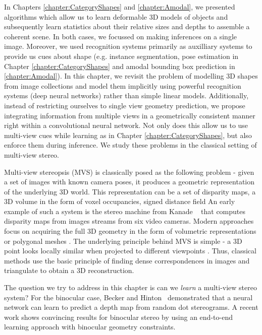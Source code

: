 \documentclass[../thesis.tex]{subfiles}
\begin{document}

In Chapters \ref{chapter:CategoryShapes} and \ref{chapter:Amodal}, we presented algorithms which allow us to learn deformable 3D models of objects and subsequently learn statistics about their relative sizes and depths to assemble a coherent scene. In both cases, we focussed on making inferences on a single image. Moreover, we used recognition systems primarily as auxilliary systems to provide us cues about shape (e.g. instance segmentation, pose estimation in Chapter \ref{chapter:CategoryShapes} and amodal bounding box prediction in \ref{chapter:Amodal}). In this chapter, we revisit the problem of modelling 3D shapes from image collections and model them implicitly using powerful recognition systems (deep neural networks) rather than simple linear models. Additionally, instead of restricting ourselves to single view geometry prediction, we propose integrating information from multiple views in a geometrically consistent manner right within a convolutional neural network. Not only does this allow us to use multi-view cues while learning as in Chapter \ref{chapter:CategoryShapes}, but also enforce them during inference. We study these problems in the classical setting of multi-view stereo.

Multi-view stereopsis (MVS) is classically posed as the following problem - given a set of images with known camera poses, it produces a geometric representation of the underlying 3D world. This representation can be a set of disparity maps, a 3D volume in the form of voxel occupancies, signed distance field \etc An early example of such a system is the stereo machine from Kanade \etal ~\cite{kanade1995development} that computes disparity maps from images streams from six video cameras. Modern approaches focus on acquiring the full 3D geometry in the form of volumetric representations or polygonal meshes \cite{seitz2006comparison}. The underlying principle behind MVS is simple - a 3D point looks locally similar when projected to different viewpoints \cite{kutulakos2000theory}. Thus, classical methods use the basic principle of finding dense correspondences in images and triangulate to obtain a 3D reconstruction.

The question we try to address in this chapter is can we \textit{learn} a multi-view stereo system? For the binocular case, Becker and Hinton~\cite{becker1992self} demonstrated that a neural network can learn to predict a depth map from random dot stereograms. A recent work \cite{kendall2017end} shows convincing results for binocular stereo by using an end-to-end learning approach with binocular geometry constraints.
\end{document}
